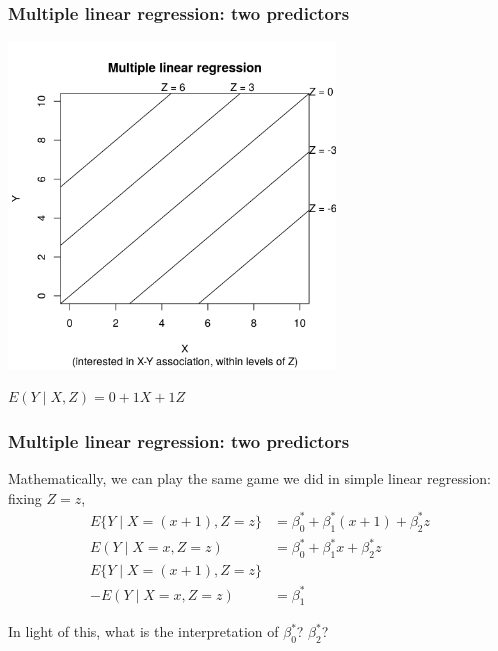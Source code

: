 \documentclass[12pt, 
hyperref={colorlinks=true, linkcolor=blue, urlcolor=cyan}]{beamer}
\begin{document}
\begin{frame}
\frametitle{Multiple linear regression: two predictors}
\centering
\includegraphics[width = 0.65\textwidth]{plots/multiple_line.png}

$E(Y \mid X, Z) = 0 + 1 X + 1 Z$
\end{frame}

\begin{frame}
\frametitle{Multiple linear regression: two predictors}

Mathematically, we can play the same game we did in simple linear regression: fixing $Z = z$, 
\begin{align*}
E\{Y \mid X = (x + 1), Z = z\} &= \beta_0^* + \beta_1^* (x + 1) + \beta_2^* z \\
E(Y \mid X = x, Z = z) &= \beta_0^* + \beta_1^* x + \beta_2^* z \\
E\{Y \mid X = (x + 1), Z = z\} & \\
- E(Y \mid X = x, Z = z) &= \beta_1^*
\end{align*}

In light of this, what is the interpretation of $\beta_0^*$? $\beta_2^*$? \vspace{2cm}
\end{frame}
\end{document}
